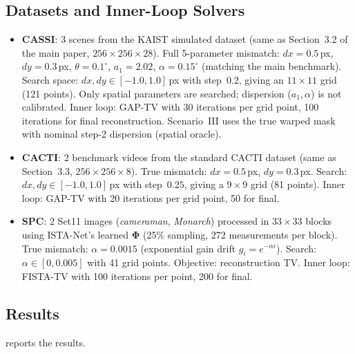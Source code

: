 \documentclass[runningheads]{llncs}
\begin{document}
\subsection{Datasets and Inner-Loop Solvers}

\begin{itemize}
    \item \textbf{CASSI}: 3 scenes from the KAIST simulated dataset (same as Section~3.2 of the main paper, $256 \times 256 \times 28$). Full 5-parameter mismatch: $dx{=}0.5$\,px, $dy{=}0.3$\,px, $\theta{=}0.1^\circ$, $a_1{=}2.02$, $\alpha{=}0.15^\circ$ (matching the main benchmark). Search space: $dx, dy \in [-1.0, 1.0]$\,px with step~$0.2$, giving an $11 \times 11$ grid (121 points). Only spatial parameters are searched; dispersion ($a_1, \alpha$) is not calibrated. Inner loop: GAP-TV with 30 iterations per grid point, 100 iterations for final reconstruction. Scenario~III uses the true warped mask with nominal step-2 dispersion (spatial oracle).
    \item \textbf{CACTI}: 2 benchmark videos from the standard CACTI dataset (same as Section~3.3, $256 \times 256 \times 8$). True mismatch: $dx{=}0.5$\,px, $dy{=}0.3$\,px. Search: $dx, dy \in [-1.0, 1.0]$\,px with step~$0.25$, giving a $9 \times 9$ grid (81 points). Inner loop: GAP-TV with 20 iterations per grid point, 50 for final.
    \item \textbf{SPC}: 2 Set11 images (\textit{cameraman}, \textit{Monarch}) processed in $33 \times 33$ blocks using ISTA-Net's learned $\mathbf{\Phi}$ (25\% sampling, 272 measurements per block). True mismatch: $\alpha{=}0.0015$ (exponential gain drift $g_i = e^{-\alpha i}$). Search: $\alpha \in [0, 0.005]$ with 41 grid points. Objective: reconstruction TV. Inner loop: FISTA-TV with 100 iterations per point, 200 for final.
\end{itemize}

\subsection{Results}

 reports the results.
\end{document}

